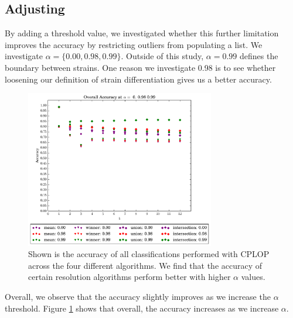 \subsection{Adjusting \a{}}
By adding a threshold value, we investigated whether this further limitation improves the accuracy by restricting outliers from populating a \knn{} list. We investigate $\alpha = \{0.00,0.98,0.99\}$. Outside of this study, $\alpha = 0.99$ defines the boundary between strains. One reason we investigate 0.98 is to see whether loosening our definition of strain differentiation gives us a better accuracy.

\begin{figure}[t]
\centering
\includegraphics[width=3.25in]{figures/krap/Overall-ALL-metrics-12-[-0_----0_98--0_99]}
\caption{Shown is the accuracy of all classifications performed with CPLOP across the four different algorithms. We find that the accuracy of certain resolution algorithms perform better with higher $\alpha$ values.}
\label{fig:alpha_overall}
\end{figure}

Overall, we observe that the accuracy slightly improves as we increase the $\alpha$ threshold. Figure \ref{fig:alpha_overall} shows that overall, the accuracy increases as we increase $\alpha$. 



